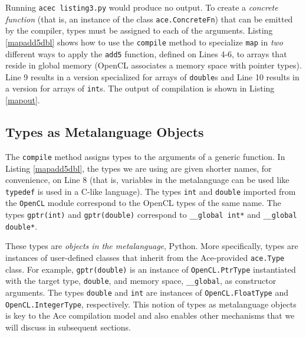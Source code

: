 \documentclass[9pt,preprint]{sigplanconf}
\begin{document}
Running \verb|acec listing3.py| would produce no output. To create a {\em concrete function} (that is, an instance of the class \verb|ace.ConcreteFn|) that can be emitted by the compiler, types must be assigned to each of the arguments. Listing \ref{mapadd5dbl} shows how to use the \verb|compile| method to specialize \verb|map| in \emph{two} different ways to apply the \verb|add5| function, defined on Lines 4-6, to arrays  that reside in global memory (OpenCL associates a memory space with pointer types). Line 9 results in a version specialized for arrays of \verb|double|s and Line 10 results in a version for arrays of \verb|int|s. The output of compilation is shown in Listing \ref{mapout}.

\subsection{Types as Metalanguage Objects}
The \verb|compile| method assigns types to the arguments of a generic function. In Listing \ref{mapadd5dbl}, the types we are using are given shorter names, for convenience, on Line 8 (that is, variables in the metalanguage can be used like \verb|typedef| is used in a C-like language). The types \verb|int| and \verb|double| imported from the \verb|OpenCL| module correspond to the OpenCL types of the same name. The types \verb|gptr(int)| and \verb|gptr(double)| correspond to \verb|__global int*| and \verb|__global double*|.

These types are \emph{objects in the metalanguage}, Python. More specifically, types are {instances} of user-defined classes that inherit from the Ace-provided \verb|ace.Type| class. For example, \verb|gptr(double)| is an instance of \verb|OpenCL.PtrType| instantiated with the target type, \verb|double|, and memory space, \verb|__global|, as constructor arguments. The types \verb|double| and \verb|int| are instances of \verb|OpenCL.FloatType| and \verb|OpenCL.IntegerType|, respectively. This notion of types as metalanguage objects is key to the Ace compilation model and also enables other mechanisms that we will discuss in subsequent sections.
\end{document}
